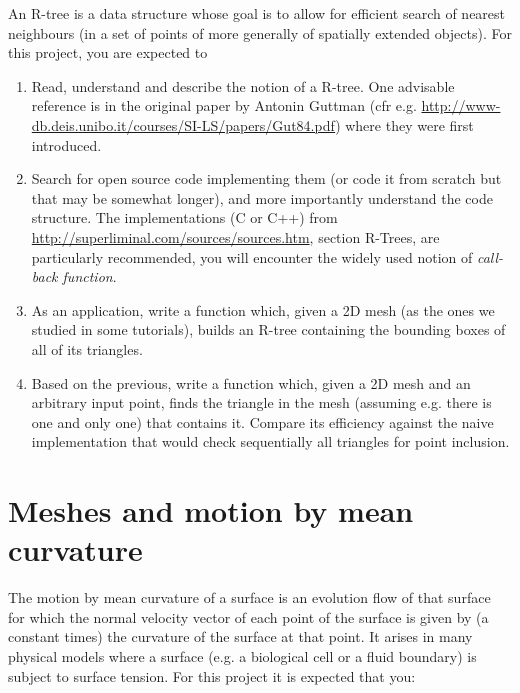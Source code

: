 \documentclass[11pt]{article}
\begin{document}
An R-tree is a data structure whose goal is to allow for efficient search of 
nearest neighbours (in a set of points of more generally of spatially extended
objects). For this project, you are expected to 
\begin{enumerate}
	\item Read, understand and describe the notion of a R-tree. One
		advisable reference is in the original paper by Antonin Guttman
		(cfr e.g. \url{http://www-db.deis.unibo.it/courses/SI-LS/papers/Gut84.pdf}) 
		where they were first introduced.
	\item Search for open source code implementing them (or code it from
		scratch but that may be somewhat longer), and
		more importantly understand the code structure. The
		implementations (C or C++) from \url{http://superliminal.com/sources/sources.htm}, section
		R-Trees, are particularly recommended, you will encounter the
		widely used notion of {\it call-back function}.
	\item As an application, write a function which, given a 2D mesh (as the
		ones we studied in some tutorials), builds an R-tree
		containing the bounding boxes of all of its triangles.
	\item Based on the previous, write a function which, given a 2D mesh and an 
		arbitrary input point, finds the triangle in the mesh (assuming e.g. there is one and only one) 
		that contains it. Compare its efficiency against the naive implementation that would 
		check sequentially all triangles for point inclusion.
\end{enumerate}

\section{Meshes and motion by mean curvature}

The motion by mean curvature of a surface is an evolution flow of that surface for which the
normal velocity vector of each point of the surface is given by (a constant times) the curvature
of the surface at that point. It arises in many physical models where a surface (e.g. a biological
cell or a fluid boundary) is subject to surface tension. For this project it is expected that you:
\end{document}
